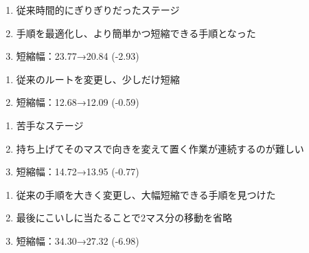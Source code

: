 \clearpage
\begin{enumerate}[label={\sarrow}]
\item 従来時間的にぎりぎりだったステージ
\item 手順を最適化し、より簡単かつ短縮できる手順となった
\item 短縮幅：23.77→20.84 (-2.93)
\end{enumerate}



\begin{enumerate}[label={\sarrow}]
\item 従来のルートを変更し、少しだけ短縮
\item 短縮幅：12.68→12.09 (-0.59)
\end{enumerate}



\begin{enumerate}[label={\sarrow}]
\item 苦手なステージ
\item 持ち上げてそのマスで向きを変えて置く作業が連続するのが難しい
\item 短縮幅：14.72→13.95 (-0.77)
\end{enumerate}



\begin{enumerate}[label={\sarrow}]
\item 従来の手順を大きく変更し、大幅短縮できる手順を見つけた
\item 最後にこいしに当たることで2マス分の移動を省略
\item 短縮幅：34.30→27.32 (-6.98)
\end{enumerate}



